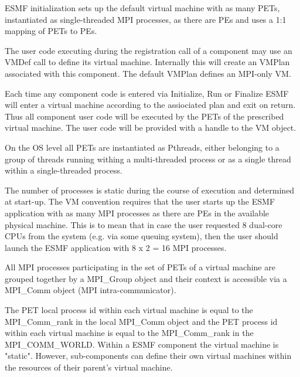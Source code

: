 ESMF initialization sets up the default virtual machine with as many PETs, instantiated as single-threaded MPI processes, as there are PEs and uses a 1:1 mapping of PETs to PEs.

The user code executing during the registration call of a component may use an VMDef call to define its virtual machine. Internally this will create an VMPlan associated with this component. The default VMPlan defines an MPI-only VM.

Each time any component code is entered via Initialize, Run or Finalize ESMF will enter a virtual machine according to the assiociated plan and exit on return. Thus all component user code will be executed by the PETs of the prescribed virtual machine. The user code will be provided with a handle to the VM object. 

On the OS level all PETs are instantiated as Pthreads, either belonging to a group of threads running withing a multi-threaded process or as a single thread within a single-threaded process.

The number of processes is static during the course of execution and determined at start-up. The VM convention requires that the user starts up the ESMF application with as many MPI processes as there are PEs in the available physical machine. This is to mean that in case the user requested 8 dual-core CPUs from the system (e.g. via some queuing system), then the user should launch the ESMF application with 8 x 2 = 16 MPI processes.

All MPI processes participating in the set of PETs of a virtual machine are grouped together by a MPI\_Group object and their context is accessible via a MPI\_Comm object (MPI intra-communicator).

The PET local process id within each virtual machine is equal to the MPI\_Comm\_rank in the local MPI\_Comm object and the PET process id within each virtual machine is equal to the MPI\_Comm\_rank in the MPI\_COMM\_WORLD.
Within a ESMF component the virtual machine is "static". However, 
sub-components can define their own virtual machines within the
resources of their parent's virtual machine.




